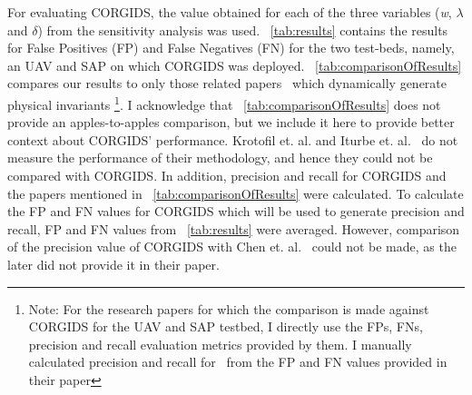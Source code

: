 \begin{table}
\centering
  \caption{Comparison of Precision and Recall for OpenAPS platform}
  \label{tab:comparisonOfResults}
\end{table}

For evaluating CORGIDS, the value obtained for each of the three variables (\textit{w}, $\lambda$ and $\delta$) from the sensitivity analysis was used. ~\autoref{tab:results} contains the results for False Positives (FP) and False Negatives (FN) for the two test-beds, namely, an UAV and SAP on which CORGIDS was deployed. ~\autoref{tab:comparisonOfResults} compares our results to only those related papers~\cite{chen2018learning,zohrevand2016hidden,aliabadi2017artinali} which dynamically generate physical invariants \footnote{Note: For the research papers for which the comparison is made against CORGIDS for the UAV and SAP testbed, I directly use the FPs, FNs, precision and recall evaluation metrics provided by them. I manually calculated precision and recall for~\cite{aliabadi2017artinali} from the FP and FN values provided in their paper}. I acknowledge that ~\autoref{tab:comparisonOfResults} does not provide an apples-to-apples comparison, but we include it here to provide better context about CORGIDS' performance.
Krotofil et. al. and Iturbe et. al.~\cite{krotofil2015process,iturbe2017feasibility} do not measure the performance of their methodology, and hence they could not be compared with CORGIDS. In addition, precision and recall for CORGIDS and the papers mentioned in ~\autoref{tab:comparisonOfResults} were calculated. To calculate the FP and FN values for CORGIDS which will be used to generate precision and recall, FP and FN values from ~\autoref{tab:results} were averaged. However, comparison of the precision value of CORGIDS with Chen et. al.~\cite{chen2018learning} could not be made, as the later did not provide it in their paper.  

